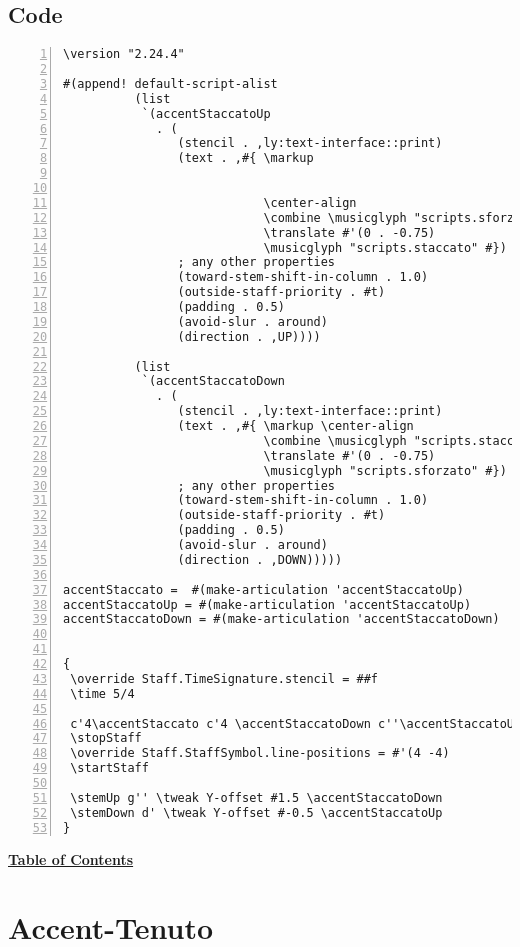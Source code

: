 \subsection{Code}
\begin{Verbatim}[numbers=left,xleftmargin=5mm]
\version "2.24.4"

#(append! default-script-alist
          (list
           `(accentStaccatoUp
             . (
                (stencil . ,ly:text-interface::print)
                (text . ,#{ \markup


                            \center-align
                            \combine \musicglyph "scripts.sforzato"
                            \translate #'(0 . -0.75) 
                            \musicglyph "scripts.staccato" #})
                ; any other properties
                (toward-stem-shift-in-column . 1.0)
                (outside-staff-priority . #t)
                (padding . 0.5)
                (avoid-slur . around)
                (direction . ,UP))))

          (list
           `(accentStaccatoDown
             . (
                (stencil . ,ly:text-interface::print)
                (text . ,#{ \markup \center-align
                            \combine \musicglyph "scripts.staccato"
                            \translate #'(0 . -0.75) 
                            \musicglyph "scripts.sforzato" #})
                ; any other properties
                (toward-stem-shift-in-column . 1.0)
                (outside-staff-priority . #t)
                (padding . 0.5)
                (avoid-slur . around)
                (direction . ,DOWN)))))

accentStaccato =  #(make-articulation 'accentStaccatoUp)
accentStaccatoUp = #(make-articulation 'accentStaccatoUp)
accentStaccatoDown = #(make-articulation 'accentStaccatoDown)


{
 \override Staff.TimeSignature.stencil = ##f
 \time 5/4

 c'4\accentStaccato c'4 \accentStaccatoDown c''\accentStaccatoUp
 \stopStaff
 \override Staff.StaffSymbol.line-positions = #'(4 -4)
 \startStaff

 \stemUp g'' \tweak Y-offset #1.5 \accentStaccatoDown
 \stemDown d' \tweak Y-offset #-0.5 \accentStaccatoUp
}
\end{Verbatim}
\hyperref[sec:toc]{\textbf{Table of Contents}}
\vfill \break



\section {Accent-Tenuto}
\hfill
{}
\hfill

